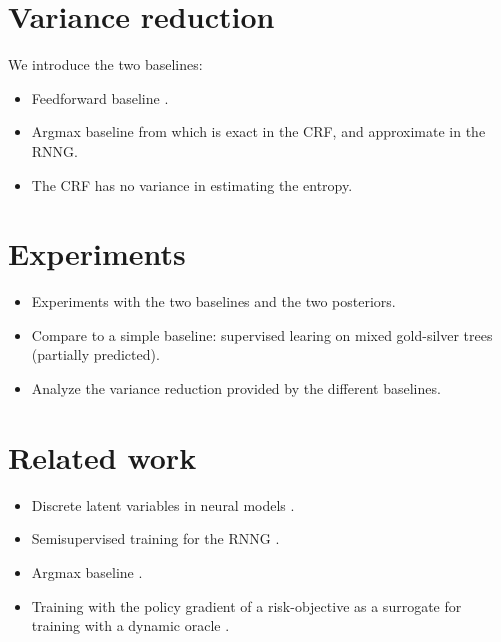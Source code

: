 \section{Variance reduction}
  We introduce the two baselines:
  \begin{itemize}
    \item Feedforward baseline \citep{miao2016discrete}.
    \item Argmax baseline from \citet{rennie2017argmax} which is exact in the CRF, and approximate in the RNNG.
    \item The CRF has no variance in estimating the entropy.
  \end{itemize}

\section{Experiments}
  \begin{itemize}
    \item Experiments with the two baselines and the two posteriors.
    \item Compare to a simple baseline: supervised learing on mixed gold-silver trees (partially predicted).
    \item Analyze the variance reduction provided by the different baselines.
  \end{itemize}

\section{Related work}
  \begin{itemize}
    \item Discrete latent variables in neural models \citep{miao2016discrete,yin2018structvae}.
    \item Semisupervised training for the RNNG \citep{cheng2017rnng}.
    \item Argmax baseline \cite{rennie2017argmax}.
    \item Training with the policy gradient of a risk-objective as a surrogate for training with a dynamic oracle \citep{klein2018reinforce}.
  \end{itemize}
